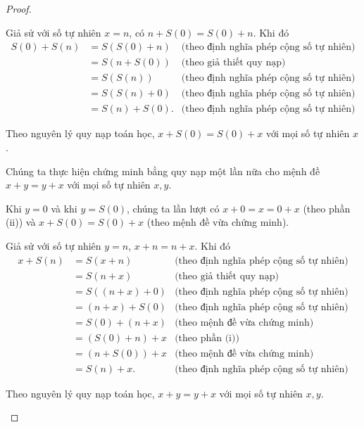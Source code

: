 \begin{proof}
\begin{enumerate}[label={(\roman*)}]
              Giả sử với số tự nhiên $x = n$, có $n + S(0) = S(0) + n$. Khi đó
              \begin{align*}
                  S(0) + S(n) & = S(S(0) + n)  & \text{(theo định nghĩa phép cộng số tự nhiên)} \\
                              & = S(n + S(0))  & \text{(theo giả thiết quy nạp)}                \\
                              & = S(S(n))      & \text{(theo định nghĩa phép cộng số tự nhiên)} \\
                              & = S(S(n) + 0)  & \text{(theo định nghĩa phép cộng số tự nhiên)} \\
                              & = S(n) + S(0). & \text{(theo định nghĩa phép cộng số tự nhiên)}
              \end{align*}

              Theo nguyên lý quy nạp toán học, $x + S(0) = S(0) + x$ với mọi số tự nhiên $x$.

              Chúng ta thực hiện chứng minh bằng quy nạp một lần nữa cho mệnh đề $x + y = y + x$ với mọi số tự nhiên $x, y$.

              Khi $y = 0$ và khi $y = S(0)$, chúng ta lần lượt có $x + 0 = x = 0 + x$ (theo phần (ii)) và $x + S(0) = S(0) + x$ (theo mệnh đề vừa chứng minh).

              Giả sử với số tự nhiên $y = n$, $x + n = n + x$. Khi đó
              \begin{align*}
                  x + S(n) & = S(x + n)       & \text{(theo định nghĩa phép cộng số tự nhiên)} \\
                           & = S(n + x)       & \text{(theo giả thiết quy nạp)}                \\
                           & = S((n + x) + 0) & \text{(theo định nghĩa phép cộng số tự nhiên)} \\
                           & = (n + x) + S(0) & \text{(theo định nghĩa phép cộng số tự nhiên)} \\
                           & = S(0) + (n + x) & \text{(theo mệnh đề vừa chứng minh)}           \\
                           & = (S(0) + n) + x & \text{(theo phần (i))}                         \\
                           & = (n + S(0)) + x & \text{(theo mệnh đề vừa chứng minh)}           \\
                           & = S(n) + x.      & \text{(theo định nghĩa phép cộng số tự nhiên)}
              \end{align*}

              Theo nguyên lý quy nạp toán học, $x + y = y + x$ với mọi số tự nhiên $x, y$.
    \end{enumerate}
\end{proof}


